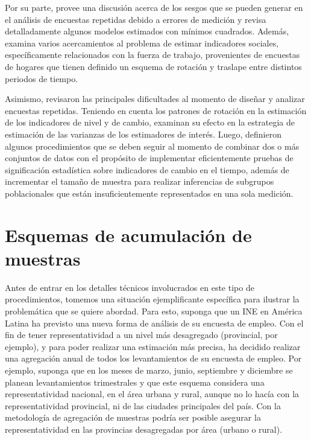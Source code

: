 \documentclass[
  12pt,
  spanish,
]{book}
\begin{document}
Por su parte, \citet{Fuller_1990} provee una
discusión acerca de los sesgos que se pueden generar en el análisis de
encuestas repetidas debido a errores de medición y revisa detalladamente
algunos modelos estimados con mínimos cuadrados. Además, \citet{Bell_2001}
examina varios acercamientos al problema de estimar indicadores
sociales, específicamente relacionados con la fuerza de trabajo,
provenientes de encuestas de hogares que tienen definido un esquema de
rotación y traslape entre distintos periodos de tiempo.

Asimismo, \citet{Steel_McLaren_2008} revisaron las principales dificultades al
momento de diseñar y analizar encuestas repetidas. Teniendo en cuenta
los patrones de rotación en la estimación de los indicadores de nivel y
de cambio, examinan su efecto en la estrategia de estimación de las
varianzas de los estimadores de interés. Luego, \citet{Lewis_2017} definieron
algunos procedimientos que se deben seguir al momento de combinar dos o
más conjuntos de datos con el propósito de implementar eficientemente
pruebas de significación estadística sobre indicadores de cambio en el
tiempo, además de incrementar el tamaño de muestra para realizar
inferencias de subgrupos poblacionales que están insuficientemente
representados en una sola medición.

\hypertarget{esquemas-de-acumulaciuxf3n-de-muestras}{%
\section{Esquemas de acumulación de muestras}\label{esquemas-de-acumulaciuxf3n-de-muestras}}

Antes de entrar en los detalles técnicos involucrados en este tipo de
procedimientos, tomemos una situación ejemplificante específica para
ilustrar la problemática que se quiere abordad. Para esto, suponga que
un INE en América Latina ha previsto una
nueva forma de análisis de su encuesta de empleo. Con el fin de tener
representatividad a un nivel más desagregado (provincial, por ejemplo),
y para poder realizar una estimación más precisa, ha decidido realizar
una agregación anual de todos los levantamientos de su encuesta de
empleo. Por ejemplo, suponga que en los meses de marzo, junio,
septiembre y diciembre se planean levantamientos trimestrales y que este
esquema considera una representatividad nacional, en el área urbana y
rural, aunque no lo hacía con la representatividad provincial, ni de las
ciudades principales del país. Con la metodología de agregación de
muestras podría ser posible asegurar la representatividad en las
provincias desagregadas por área (urbano o rural).
\end{document}
